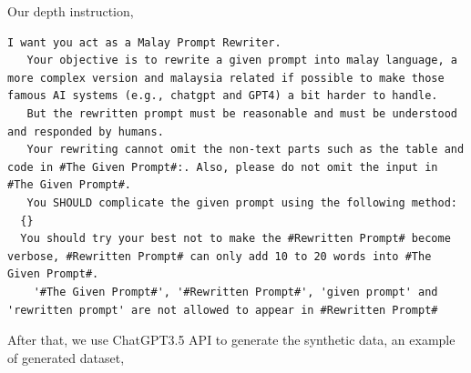 \documentclass[preprint]{article}
\begin{document}
Our depth instruction,

\begin{lstlisting}[]
  I want you act as a Malay Prompt Rewriter.
   Your objective is to rewrite a given prompt into malay language, a more complex version and malaysia related if possible to make those famous AI systems (e.g., chatgpt and GPT4) a bit harder to handle.
   But the rewritten prompt must be reasonable and must be understood and responded by humans.
   Your rewriting cannot omit the non-text parts such as the table and code in #The Given Prompt#:. Also, please do not omit the input in #The Given Prompt#. 
   You SHOULD complicate the given prompt using the following method: 
  {} 
  You should try your best not to make the #Rewritten Prompt# become verbose, #Rewritten Prompt# can only add 10 to 20 words into #The Given Prompt#. 
	'#The Given Prompt#', '#Rewritten Prompt#', 'given prompt' and 'rewritten prompt' are not allowed to appear in #Rewritten Prompt#
\end{lstlisting}

After that, we use ChatGPT3.5 API to generate the synthetic data, an example of generated dataset,
\end{document}
